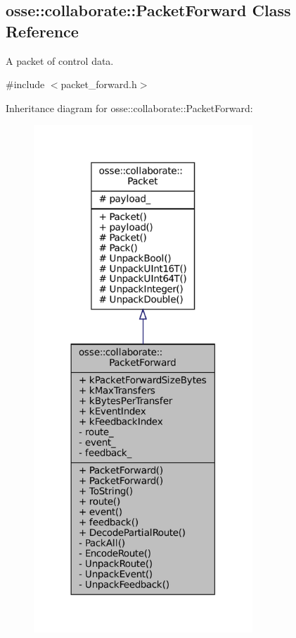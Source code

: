 \hypertarget{classosse_1_1collaborate_1_1_packet_forward}{}\subsection{osse\+:\+:collaborate\+:\+:Packet\+Forward Class Reference}
\label{classosse_1_1collaborate_1_1_packet_forward}


A packet of control data.  




{\ttfamily \#include $<$packet\+\_\+forward.\+h$>$}



Inheritance diagram for osse\+:\+:collaborate\+:\+:Packet\+Forward\+:
\nopagebreak
\begin{figure}[H]
\begin{center}
\leavevmode
\includegraphics[width=233pt]{classosse_1_1collaborate_1_1_packet_forward__inherit__graph}
\end{center}
\end{figure}
